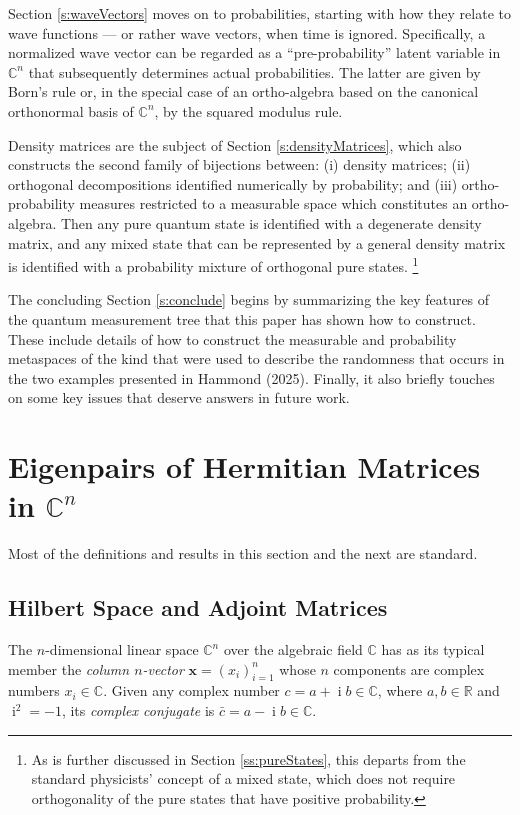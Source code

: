 \documentclass[11pt]{article}
\newcommand \R { \mathbb{R} }
\newcommand \C { \mathbb{C} }
\DeclareMathOperator{\imag}{\mathrm{i}}
\begin{document}
Section \ref{s:waveVectors} moves on to probabilities, 
starting with how they relate to wave functions 
--- or rather wave vectors, when time is ignored.
Specifically, a normalized wave vector %
can be regarded as a ``pre-probability'' latent variable in $ \C^n $
that subsequently determines actual probabilities.
The latter are given by Born's rule or, in the special case of an ortho-algebra 
based on the canonical orthonormal basis of $ \C^n $, by the squared modulus rule.

Density matrices are the subject of Section \ref{s:densityMatrices}, 
which also constructs the second family of bijections between: (i) density matrices;
(ii) orthogonal decompositions identified numerically by probability;
and (iii) ortho-probability measures restricted to a measurable space 
which constitutes an ortho-algebra.
Then any pure quantum state is identified with a degenerate density matrix,
and any mixed state that can be represented by a general density matrix 
is identified with a probability mixture of orthogonal pure states.%
\footnote{As is further discussed in Section \ref{ss:pureStates},
this departs from the standard physicists' concept of a mixed state,
which does not require orthogonality of the pure states that have positive probability.} 

The concluding Section \ref{s:conclude} begins by summarizing the key features 
of the quantum measurement tree that this paper has shown how to construct.
These include details of how to construct the measurable and probability metaspaces
of the kind that were used to describe the randomness that occurs  
in the two examples presented in Hammond (2025).
Finally, it also briefly touches on some key issues that deserve answers in future work.

\section{Eigenpairs of Hermitian Matrices in $ \C^n $} \label{s:eigenpairs}

Most of the definitions and results in this section and the next are standard.

\subsection{Hilbert Space and Adjoint Matrices}

The $n$-dimensional linear space $ \C^n $ over the algebraic field $ \C $
has as its typical member the \emph{column $n$-vector} $ \mathbf x = ( x_i )_{i = 1}^n $
whose $n$ components are complex numbers $ x_i \in \C $.
Given any complex number $c = a + \imag b \in \C$, where $a, b \in \R$ and $ \imag ^2 = -1$,
its \emph{complex conjugate} is $ \bar c = a - \imag b \in \C$. 
\end{document}
